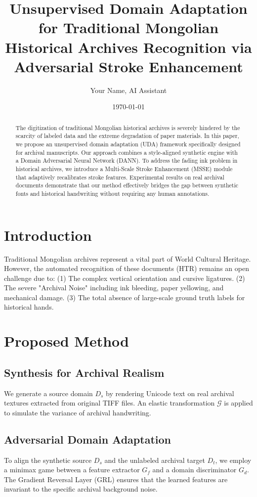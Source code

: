 \documentclass[twocolumn]{article}
\title{Unsupervised Domain Adaptation for Traditional Mongolian Historical Archives Recognition via Adversarial Stroke Enhancement}
\author{Your Name, AI Assistant}
\date{\today}
\begin{document}
\maketitle

\begin{abstract}
The digitization of traditional Mongolian historical archives is severely hindered by the scarcity of labeled data and the extreme degradation of paper materials. In this paper, we propose an unsupervised domain adaptation (UDA) framework specifically designed for archival manuscripts. Our approach combines a style-aligned synthetic engine with a Domain Adversarial Neural Network (DANN). To address the fading ink problem in historical archives, we introduce a Multi-Scale Stroke Enhancement (MSSE) module that adaptively recalibrates stroke features. Experimental results on real archival documents demonstrate that our method effectively bridges the gap between synthetic fonts and historical handwriting without requiring any human annotations.
\end{abstract}

\section{Introduction}
Traditional Mongolian archives represent a vital part of World Cultural Heritage. However, the automated recognition of these documents (HTR) remains an open challenge due to: (1) The complex vertical orientation and cursive ligatures. (2) The severe "Archival Noise" including ink bleeding, paper yellowing, and mechanical damage. (3) The total absence of large-scale ground truth labels for historical hands.

\section{Proposed Method}
\subsection{Synthesis for Archival Realism}
We generate a source domain $D_s$ by rendering Unicode text on real archival textures extracted from original TIFF files. An elastic transformation $\mathcal{G}$ is applied to simulate the variance of archival handwriting.

\subsection{Adversarial Domain Adaptation}
To align the synthetic source $D_s$ and the unlabeled archival target $D_t$, we employ a minimax game between a feature extractor $G_f$ and a domain discriminator $G_d$. The Gradient Reversal Layer (GRL) ensures that the learned features are invariant to the specific archival background noise.
\end{document}
